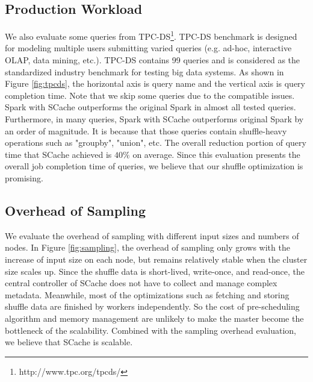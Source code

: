 \subsection{Production Workload}
We also evaluate some queries from TPC-DS\footnote{http://www.tpc.org/tpcds/}. 
TPC-DS benchmark is designed for modeling multiple users submitting varied queries (e.g. ad-hoc, interactive OLAP, data mining, etc.). 
TPC-DS contains 99 queries and is considered as the standardized industry benchmark for testing big data systems. 
As shown in Figure \ref{fig:tpcds}, the horizontal axis is query name and the vertical axis is query completion time. 
Note that we skip some queries due to the compatible issues. 
Spark with SCache outperforms the original Spark in almost all tested queries. 
Furthermore, in many queries, Spark with SCache outperforms original Spark by an order of magnitude. 
It is because that those queries contain shuffle-heavy operations such as "groupby", "union", etc.
The overall reduction portion of query time that SCache achieved is $40\%$ on average. 
Since this evaluation presents the overall job completion time of queries, we believe that our shuffle optimization is promising.


\subsection{Overhead of Sampling}
We evaluate the overhead of sampling with different input sizes and numbers of nodes. 
In Figure \ref{fig:sampling}, the overhead of sampling only grows with the increase of input size on each node, but remains relatively stable when the cluster size scales up.
Since the shuffle data is short-lived, write-once, and read-once, the central controller of SCache does not have to collect and manage complex metadata. 
Meanwhile, most of the optimizations such as fetching and storing shuffle data are finished by workers independently. 
So the cost of pre-scheduling algorithm and memory management are unlikely to make the master become the bottleneck of the scalability.
Combined with the sampling overhead evaluation, we believe that SCache is scalable.

